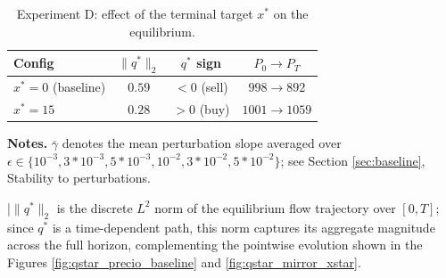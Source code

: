 \documentclass[11pt]{article}
\theoremstyle{definition}
\begin{document}
\begin{table}[H]
\centering
\caption{Experiment D: effect of the terminal target $x^*$ on the equilibrium.}
\label{tab:exp_D}
\begin{tabular}{lccc}
\hline
Config & $\|q^*\|_2$ & $q^*$ sign & $P_0 \to P_T$ \\
\hline
$x^* = 0$ (baseline) & $0.59$ & $< 0$ (sell) & $998 \to 892$ \\
$x^* = 15$ & $0.28$ & $> 0$ (buy) & $1001 \to 1059$ \\
\hline
\end{tabular}
\end{table}

\textbf{Notes.}
$\overline{\gamma}$ denotes the mean perturbation slope averaged over $\epsilon\in\{10^{-3}, 3*10^{-3}, 5*10^{-3}, 10^{-2}, 3*10^{-2}, 5*10^{-2}\}$; see Section \ref{sec:baseline}, Stability to perturbations. 

|$\|q^*\|_2$ is the discrete $L^2$ norm of the equilibrium flow trajectory over $[0,T]$; since $q^*$ is a time-dependent path, this norm captures its aggregate magnitude across the full horizon, complementing the pointwise evolution shown in the Figures \ref{fig:qstar_precio_baseline} and \ref{fig:qstar_mirror_xstar}.




\end{document}
